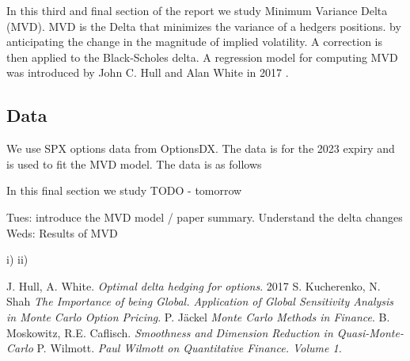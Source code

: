 \documentclass{article}
\begin{document}
In this third and final section of the report we study Minimum Variance Delta (MVD). MVD is the Delta that minimizes the variance of a hedgers positions.
by anticipating the change in the magnitude of implied volatility. A correction is then applied to the Black-Scholes delta. 
A regression model for computing MVD was introduced by John C. Hull and Alan White in 2017 \cite{hull}.



\subsection*{Data}

We use SPX options data from OptionsDX. The data is for the 2023 expiry and is used to fit the MVD model. The data is as follows


In this final section we study 
TODO - tomorrow 

Tues: introduce the MVD model / paper summary. Understand the delta changes 
Weds: Results of MVD

i) 
ii) 

\begin{thebibliography}{9}
J. Hull, A. White. \textit{Optimal delta hedging for options}. 2017
S. Kucherenko, N. Shah \textit{The Importance of being Global. Application of Global Sensitivity Analysis in Monte Carlo Option Pricing}.
P. J{\"a}ckel \textit{Monte Carlo Methods in Finance}.
B. Moskowitz, R.E. Caflisch. \textit{Smoothness and Dimension Reduction in Quasi-Monte-Carlo}
P. Wilmott. \textit{Paul Wilmott on Quantitative Finance. Volume 1.}
\end{thebibliography}
\end{document}
